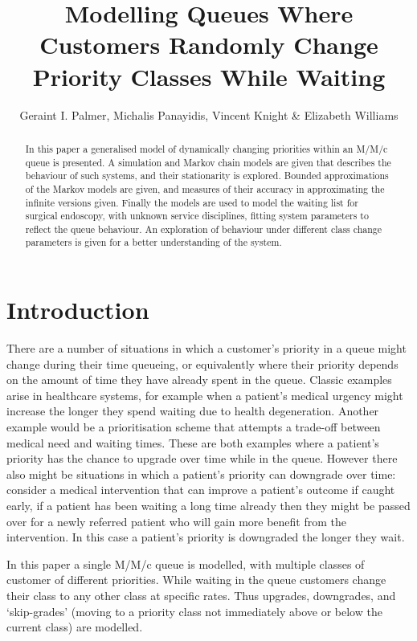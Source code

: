 \documentclass{article}
\title{Modelling Queues Where Customers Randomly Change Priority Classes While Waiting}
\author{Geraint I. Palmer, Michalis Panayidis, Vincent Knight \& Elizabeth Williams}
\date{}
\begin{document}
\maketitle

\begin{abstract}
In this paper a generalised model of dynamically changing priorities within an
M/M/c queue is presented. A simulation and Markov chain models are given that
describes the behaviour of such systems, and their stationarity is explored.
Bounded approximations of the Markov models are given, and measures of their
accuracy in approximating the infinite versions given. Finally the models are
used to model the waiting list for surgical endoscopy, with unknown service
disciplines, fitting system parameters to reflect the queue behaviour. An
exploration of behaviour under different class change parameters is given for a
better understanding of the system. 
\end{abstract}

\section{Introduction}
There are a number of situations in which a customer's priority in a queue might
change during their time queueing, or equivalently where their priority depends
on the amount of time they have already spent in the queue.
Classic examples arise in healthcare systems, for example when a patient's
medical urgency might increase the longer they spend waiting due to health
degeneration. Another example would be a prioritisation scheme that attempts a
trade-off between medical need and waiting times.
These are both examples where a patient's priority has the chance to upgrade
over time while in the queue.
However there also might be situations in which a patient's priority can
downgrade over time: consider a medical intervention that can improve a
patient's outcome if caught early, if a patient has been waiting a long time
already then they might be passed over for a newly referred patient who will
gain more benefit from the intervention. In this case a patient's priority is
downgraded the longer they wait.

In this paper a single M/M/c queue is modelled, with multiple classes of
customer of different priorities. While waiting in the queue customers change
their class to any other class at specific rates. Thus upgrades, downgrades, and
`skip-grades' (moving to a priority class not immediately above or below the
current class) are modelled.
\end{document}
